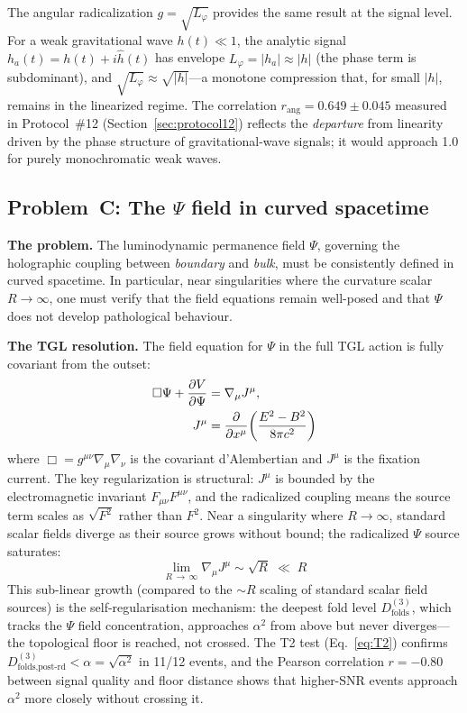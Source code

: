 \documentclass[12pt,a4paper,twocolumn]{article}
\newcommand{\alphaii}{\alpha^{2}}
\newcommand{\boundary}{\textit{boundary}}
\newcommand{\bulk}{\textit{bulk}}
\begin{document}
The angular radicalization $g = \sqrt{L_\varphi}$ provides the same result at 
the signal level. For a weak gravitational wave $h(t) \ll 1$, the analytic 
signal $h_a(t) = h(t) + i\hat{h}(t)$ has envelope $L_\varphi = |h_a| \approx 
|h|$ (the phase term is subdominant), and $\sqrt{L_\varphi} \approx 
\sqrt{|h|}$---a monotone compression that, for small $|h|$, remains in 
the linearized regime. The correlation $r_{\text{ang}} = 0.649 \pm 0.045$ 
measured in Protocol~\#12 (Section~\ref{sec:protocol12}) reflects the 
\emph{departure} from linearity driven by the phase structure of 
gravitational-wave signals; it would approach 1.0 for purely monochromatic 
weak waves.

\subsection{Problem~C: The $\Psi$ field in curved spacetime}
\label{sec:problem_c}

\textbf{The problem.} The luminodynamic permanence field $\Psi$, governing 
the holographic coupling between \boundary{} and \bulk, must be consistently 
defined in curved spacetime. In particular, near singularities where the 
curvature scalar $R \to \infty$, one must verify that the field equations 
remain well-posed and that $\Psi$ does not develop pathological behaviour.

\textbf{The TGL resolution.} The field equation for $\Psi$ in the full TGL 
action is fully covariant from the outset:
\begin{align}
\Box\Psi + \frac{\partial V}{\partial\Psi} &= \nabla_\mu J^\mu, \notag\\ 
J^\mu &= \frac{\partial}{\partial x^\mu}\!\left(\frac{E^2 - B^2}{8\pi c^2}\right)
\label{eq:Psi_eom}
\end{align}
where $\Box = g^{\mu\nu}\nabla_\mu\nabla_\nu$ is the covariant d'Alembertian 
and $J^\mu$ is the fixation current. The key regularization is structural: 
$J^\mu$ is bounded by the electromagnetic invariant $F_{\mu\nu}F^{\mu\nu}$, 
and the radicalized coupling means the source term scales as 
$\sqrt{F^2}$ rather than $F^2$. Near a singularity where $R \to \infty$, 
standard scalar fields diverge as their source grows without bound; the 
radicalized $\Psi$ source saturates:
\begin{equation}
\lim_{R\,\to\,\infty} \nabla_\mu J^\mu \sim \sqrt{R} \;\ll\; R
\label{eq:saturation}
\end{equation}
This sub-linear growth (compared to the $\sim R$ scaling of standard scalar 
field sources) is the self-regularisation mechanism: the deepest fold level $D_{\text{folds}}^{(3)}$, which tracks 
the $\Psi$ field concentration, approaches $\alphaii$ from above but never 
diverges---the topological floor is reached, not crossed. The T2 test 
(Eq.~\ref{eq:T2}) confirms $D_{\text{folds},\text{post-rd}}^{(3)} < \alpha 
= \sqrt{\alphaii}$ in 11/12 events, and the Pearson correlation $r = -0.80$ 
between signal quality and floor distance shows that higher-SNR events 
approach $\alphaii$ more closely without crossing it.
\end{document}

